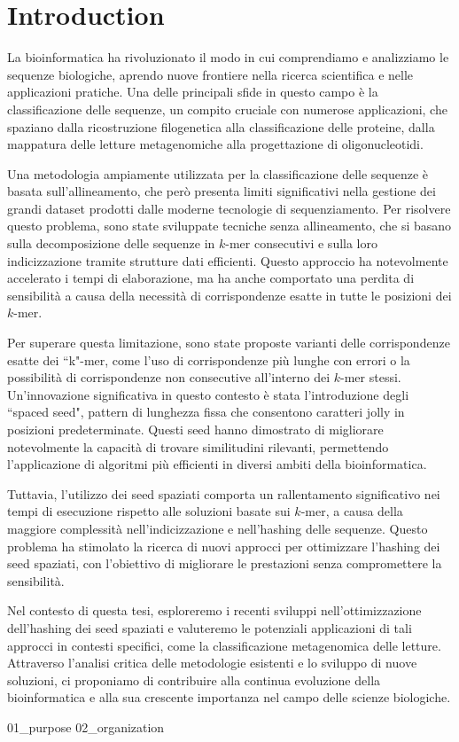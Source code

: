 \chapter{Introduction}
\label{chp:introduction}

La bioinformatica ha rivoluzionato il modo in cui comprendiamo e analizziamo le sequenze biologiche, aprendo nuove frontiere nella ricerca scientifica e nelle applicazioni pratiche. Una delle principali sfide in questo campo è la classificazione delle sequenze, un compito cruciale con numerose applicazioni, che spaziano dalla ricostruzione filogenetica alla classificazione delle proteine, dalla mappatura delle letture metagenomiche alla progettazione di oligonucleotidi.

Una metodologia ampiamente utilizzata per la classificazione delle sequenze è basata sull'allineamento, che però presenta limiti significativi nella gestione dei grandi dataset prodotti dalle moderne tecnologie di sequenziamento. Per risolvere questo problema, sono state sviluppate tecniche senza allineamento, che si basano sulla decomposizione delle sequenze in $k$-mer consecutivi e sulla loro indicizzazione tramite strutture dati efficienti. Questo approccio ha notevolmente accelerato i tempi di elaborazione, ma ha anche comportato una perdita di sensibilità a causa della necessità di corrispondenze esatte in tutte le posizioni dei $k$-mer.

Per superare questa limitazione, sono state proposte varianti delle corrispondenze esatte dei “k"-mer, come l'uso di corrispondenze più lunghe con errori o la possibilità di corrispondenze non consecutive all'interno dei $k$-mer stessi. Un'innovazione significativa in questo contesto è stata l'introduzione degli “spaced seed", pattern di lunghezza fissa che consentono caratteri jolly in posizioni predeterminate. Questi seed hanno dimostrato di migliorare notevolmente la capacità di trovare similitudini rilevanti, permettendo l'applicazione di algoritmi più efficienti in diversi ambiti della bioinformatica.

Tuttavia, l'utilizzo dei seed spaziati comporta un rallentamento significativo nei tempi di esecuzione rispetto alle soluzioni basate sui $k$-mer, a causa della maggiore complessità nell'indicizzazione e nell'hashing delle sequenze. Questo problema ha stimolato la ricerca di nuovi approcci per ottimizzare l'hashing dei seed spaziati, con l'obiettivo di migliorare le prestazioni senza compromettere la sensibilità.

Nel contesto di questa tesi, esploreremo i recenti sviluppi nell'ottimizzazione dell'hashing dei seed spaziati e valuteremo le potenziali applicazioni di tali approcci in contesti specifici, come la classificazione metagenomica delle letture. Attraverso l'analisi critica delle metodologie esistenti e lo sviluppo di nuove soluzioni, ci proponiamo di contribuire alla continua evoluzione della bioinformatica e alla sua crescente importanza nel campo delle scienze biologiche.


{01_purpose}
{02_organization}
